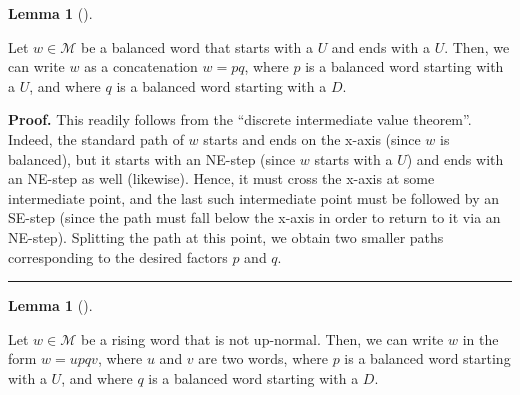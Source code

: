 \documentclass[numbers=enddot,12pt,final,onecolumn,notitlepage]{scrartcl}%
\theoremstyle{definition}
\newtheorem{lem}[theo]{Lemma}
\newenvironment{lemma}[1][]
{\begin{lem}[#1]\begin{leftbar}}
{\end{leftbar}\end{lem}}
\newenvironment{proof}[1][Proof]{\noindent\textbf{#1.} }{\ \rule{0.5em}{0.5em}}
\newcommand{\M}{\mathcal{M}}
\newenvironment{vershort}{}{}
\begin{document}
\begin{vershort}
\begin{lemma}
\label{lem.balanced.0}
Let $w\in\M$ be a balanced word that starts
with a $U$ and ends with a $U$.
Then, we can write $w$ as a concatenation $w=pq$, where $p$ is a balanced word starting with a $U$, and where $q$ is a balanced word starting with a $D$.
\end{lemma}

\begin{proof}
This readily follows from the ``discrete intermediate value theorem''.
Indeed, the standard path of $w$ starts and ends on the x-axis (since $w$ is balanced), but it starts with an NE-step (since $w$ starts with a $U$) and ends with an NE-step as well (likewise).
Hence, it must cross the x-axis at some intermediate point, and the last such intermediate point must be followed by an SE-step (since the path must fall below the x-axis in order to return to it via an NE-step).
Splitting the path at this point, we obtain two smaller paths corresponding to the desired factors $p$ and $q$.
\end{proof}

\begin{lemma}
\label{lem.upnorm.1}Let $w\in\M$ be a rising word that is not
up-normal. Then, we can write $w$ in the form $w=upqv$, where $u$ and $v$ are
two words, where $p$ is a balanced word starting with a $U$, and where $q$ is
a balanced word starting with a $D$.
\end{lemma}


\end{vershort}
\end{document}
